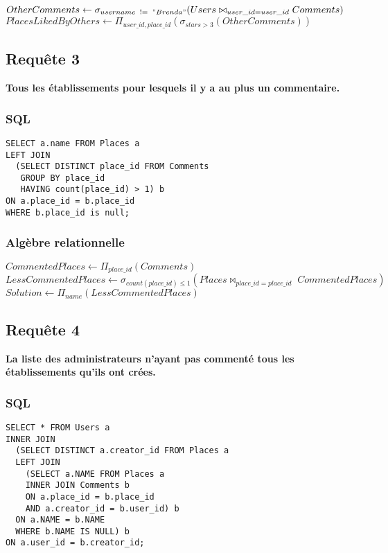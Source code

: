 \documentclass[a4paper,10pt]{article}
\begin{document}
$OtherComments \leftarrow \sigma_{username\;\; != \;\;"Brenda"} (Users \bowtie_{user\_id=user\_id} Comments )$\\

$PlacesLikedByOthers \leftarrow \Pi_{user\_id, place\_id} ( \sigma_{stars>3} (OtherComments)) $

\subsection{Requête 3}

\textbf{Tous les établissements pour lesquels il y a au plus un commentaire.}

\subsubsection{SQL}

\begin{verbatim}
SELECT a.name FROM Places a 
LEFT JOIN
  (SELECT DISTINCT place_id FROM Comments 
   GROUP BY place_id 
   HAVING count(place_id) > 1) b 
ON a.place_id = b.place_id 
WHERE b.place_id is null;
\end{verbatim}

\subsubsection{Algèbre relationnelle}

$ CommentedPlaces \leftarrow \Pi_{place\_id} (Comments) $ \\

$ LessCommentedPlaces \leftarrow \sigma_{count(place\_id) \leq 1} (Places \bowtie_{place\_id = place\_id} \; CommentedPlaces)$ \\

$ Solution \leftarrow \Pi_{name}(LessCommentedPlaces) $

\newpage

\subsection{Requête 4}

\textbf{La liste des administrateurs n’ayant pas commenté tous les établissements qu’ils ont crées.}

\subsubsection{SQL}

\begin{verbatim}
SELECT * FROM Users a
INNER JOIN
  (SELECT DISTINCT a.creator_id FROM Places a
  LEFT JOIN
    (SELECT a.NAME FROM Places a
    INNER JOIN Comments b
    ON a.place_id = b.place_id
    AND a.creator_id = b.user_id) b
  ON a.NAME = b.NAME
  WHERE b.NAME IS NULL) b
ON a.user_id = b.creator_id; 
\end{verbatim}
\end{document}
